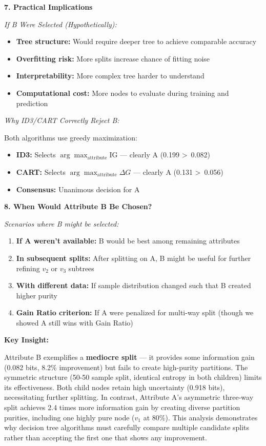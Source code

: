 \documentclass[12pt]{article}
\begin{document}
\begin{explanation}
\textbf{7. Practical Implications}

\textit{If B Were Selected (Hypothetically):}

\begin{itemize}
    \item \textbf{Tree structure:} Would require deeper tree to achieve comparable accuracy
    \item \textbf{Overfitting risk:} More splits increase chance of fitting noise
    \item \textbf{Interpretability:} More complex tree harder to understand
    \item \textbf{Computational cost:} More nodes to evaluate during training and prediction
\end{itemize}

\textit{Why ID3/CART Correctly Reject B:}

Both algorithms use greedy maximization:
\begin{itemize}
    \item \textbf{ID3:} Selects $\arg\max_{\text{attribute}} \text{IG}$ — clearly A (0.199 \textgreater\ 0.082)
    \item \textbf{CART:} Selects $\arg\max_{\text{attribute}} \Delta G$ — clearly A (0.131 \textgreater\ 0.056)
    \item \textbf{Consensus:} Unanimous decision for A
\end{itemize}

\textbf{8. When Would Attribute B Be Chosen?}

\textit{Scenarios where B might be selected:}

\begin{enumerate}
    \item \textbf{If A weren't available:} B would be best among remaining attributes
    \item \textbf{In subsequent splits:} After splitting on A, B might be useful for further refining $v_2$ or $v_3$ subtrees
    \item \textbf{With different data:} If sample distribution changed such that B created higher purity
    \item \textbf{Gain Ratio criterion:} If A were penalized for multi-way split (though we showed A still wins with Gain Ratio)
\end{enumerate}

\textbf{Key Insight:}

Attribute B exemplifies a \textbf{mediocre split} — it provides some information gain (0.082 bits, 8.2\% improvement) but fails to create high-purity partitions. The symmetric structure (50-50 sample split, identical entropy in both children) limits its effectiveness. Both child nodes retain high uncertainty (0.918 bits), necessitating further splitting. In contrast, Attribute A's asymmetric three-way split achieves 2.4 times more information gain by creating diverse partition purities, including one highly pure node ($v_1$ at 80\%). This analysis demonstrates why decision tree algorithms must carefully compare multiple candidate splits rather than accepting the first one that shows any improvement.
\end{explanation}
\end{document}
